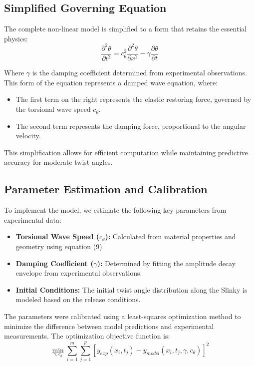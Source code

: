 \documentclass{mcmthesis}  %
\begin{document}
\subsection{Simplified Governing Equation}
The complete non-linear model is simplified to a form that retains the essential physics:
\begin{equation}
\frac{\partial^2 \theta}{\partial t^2} = c_{\theta}^2 \frac{\partial^2 \theta}{\partial x^2} - \gamma \frac{\partial \theta}{\partial t}
\end{equation}

Where $\gamma$ is the damping coefficient determined from experimental observations. This form of the equation represents a damped wave equation, where:
\begin{itemize}
    \item The first term on the right represents the elastic restoring force, governed by the torsional wave speed $c_{\theta}$.
    \item The second term represents the damping force, proportional to the angular velocity.
\end{itemize}

This simplification allows for efficient computation while maintaining predictive accuracy for moderate twist angles.

\subsection{Parameter Estimation and Calibration}
To implement the model, we estimate the following key parameters from experimental data:
\begin{itemize}
    \item \textbf{Torsional Wave Speed ($c_{\theta}$):} Calculated from material properties and geometry using equation (9).
    \item \textbf{Damping Coefficient ($\gamma$):} Determined by fitting the amplitude decay envelope from experimental observations.
    \item \textbf{Initial Conditions:} The initial twist angle distribution along the Slinky is modeled based on the release conditions.
\end{itemize}

The parameters were calibrated using a least-squares optimization method to minimize the difference between model predictions and experimental measurements. The optimization objective function is:
\begin{equation}
\min_{\gamma, c_{\theta}} \sum_{i=1}^{m} \sum_{j=1}^{p} [y_{exp}(x_i, t_j) - y_{model}(x_i, t_j, \gamma, c_{\theta})]^2
\end{equation}
\end{document}
